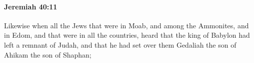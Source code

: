 
		\paragraph{Jeremiah 40:11} %
			\label{JEREMIAH-40-11}

			Likewise when all the Jews that were in Moab, and among the Ammonites, and in Edom, and that were in all the countries, heard that the king of Babylon had left a remnant of Judah, and that he had set over them Gedaliah the son of Ahikam the son of Shaphan;


